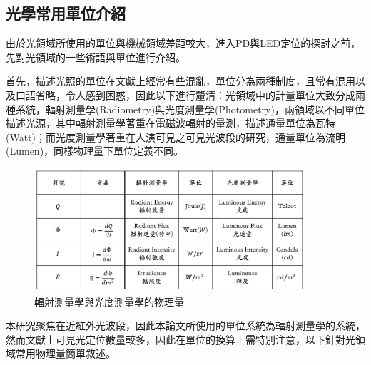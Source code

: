     \subsection{光學常用單位介紹}
        
        由於光領域所使用的單位與機械領域差距較大，進入PD與LED定位的探討之前，先對光領域的一些術語與單位進行介紹。

        首先，描述光照的單位在文獻上經常有些混亂，單位分為兩種制度，且常有混用以及口語省略，令人感到困惑，因此以下進行釐清：光領域中的計量單位大致分成兩種系統，輻射測量學(Radiometry)與光度測量學(Photometry)，兩領域以不同單位描述光源，其中輻射測量學著重在電磁波輻射的量測，描述通量單位為瓦特(Watt)；而光度測量學著重在人演可見之可見光波段的研究，通量單位為流明(Lumen)，同樣物理量下單位定義不同。\cite{radiometry_and_photometry}
        

        \begin{figure}[ht]
            \centering
            \caption{輻射測量學與光度測量學的物理量}
            \label{tab:photometry}
            \includegraphics[width=10cm]{ch2pic/photometry_table.png}
        \end{figure}


        本研究聚焦在近紅外光波段，因此本論文所使用的單位系統為輻射測量學的系統，然而文獻上可見光定位數量較多，因此在單位的換算上需特別注意，以下針對光領域常用物理量簡單敘述。

